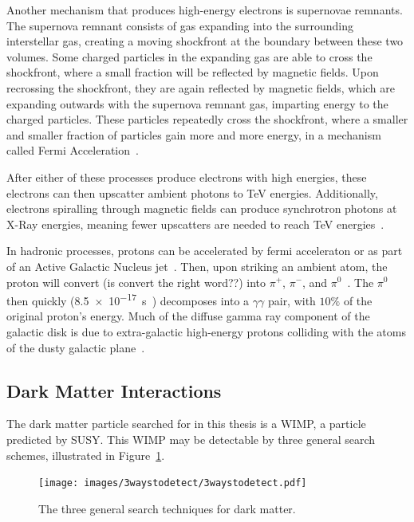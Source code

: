   Another mechanism that produces high-energy electrons is supernovae remnants.
  The supernova remnant consists of gas expanding into the surrounding interstellar gas, creating a moving shockfront at the boundary between these two volumes.
  Some charged particles in the expanding gas are able to cross the shockfront, where a small fraction will be reflected by magnetic fields.
  Upon recrossing the shockfront, they are again reflected by magnetic fields, which are expanding outwards with the supernova remnant gas, imparting energy to the charged particles.
  These particles repeatedly cross the shockfront, where a smaller and smaller fraction of particles gain more and more energy, in a mechanism called Fermi Acceleration~\cite{fermi1949,highenergyelectron_snr}.
  
  After either of these processes produce electrons with high energies, these electrons can then upscatter ambient photons to TeV energies.
  Additionally, electrons spiralling through magnetic fields can produce synchrotron photons at X-Ray energies, meaning fewer upscatters are needed to reach TeV energies~\cite{self_compton}.

  In hadronic processes, protons can be accelerated by fermi acceleraton or as part of an Active Galactic Nucleus jet~\cite{hadronic1,hadronic2}.
  Then, upon striking an ambient atom, the proton will {\color{red}convert (is convert the right word??)} into $\pi^{+}$, $\pi^{-}$, and $\pi^{0}$~\cite{pp_pion,pp_pion2}.
  The $\pi^{0}$ then quickly (\SI{8.5e-17}{s}~\cite{pdg2016}) decomposes into a $\gamma\gamma$ pair, with \nicetilde$10\%$ of the original proton's energy.
  Much of the diffuse gamma ray component of the galactic disk is due to extra-galactic high-energy protons colliding with the atoms of the dusty galactic plane~\cite{GalacticDiffuseGammaRays}.

  \subsection{Dark Matter Interactions}\label{dmgammaproduction}
    
    The dark matter particle searched for in this thesis is a WIMP, a particle predicted by SUSY.
    This WIMP may be detectable by three general search schemes, illustrated in Figure~\ref{fig:3_searches}.

    \begin{figure}[ht]
      \centering
      \texttt{[image: images/3waystodetect/3waystodetect.pdf]}
      \caption[3 Search Techniques]{
        The three general search techniques for dark matter.}
      \label{fig:3_searches}
    \end{figure}
    
